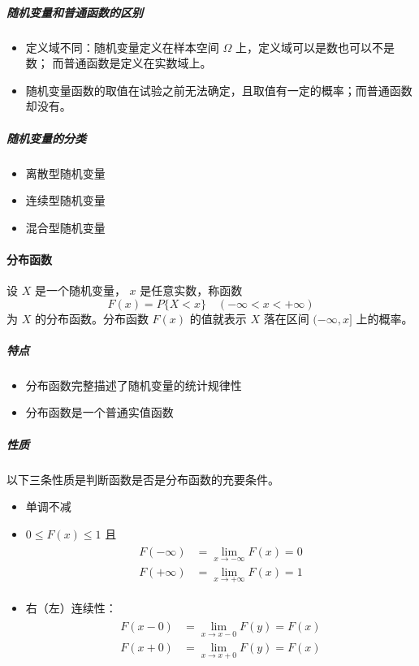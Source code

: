 \subparagraph{随机变量和普通函数的区别}
\begin{itemize}[leftmargin=\subparitemindent]
    \item 定义域不同：随机变量定义在样本空间 $ \Omega $ 上，定义域可以是数也可以不是数；
    而普通函数是定义在实数域上。
    \item 随机变量函数的取值在试验之前无法确定，且取值有一定的概率；而普通函数却没有。
\end{itemize}

\subparagraph{随机变量的分类}
\begin{itemize}[leftmargin=\subparitemindent]
    \item 离散型随机变量
    \item 连续型随机变量
    \item 混合型随机变量
\end{itemize}

\paragraph{分布函数} 设 $ X $ 是一个随机变量， $ x $ 是任意实数，称函数 \begin{equation}
    \label{equ:分布函数定义}
    F(x) = P\{X < x\} \quad (-\infty < x < +\infty)
\end{equation}
为 $ X $ 的分布函数。分布函数 $ F(x) $ 的值就表示 $ X $ 落在区间 $ (-\infty,x] $ 上的概率。

\subparagraph{特点} 
\begin{itemize}[leftmargin=\subparitemindent]
    \item 分布函数完整描述了随机变量的统计规律性
    \item 分布函数是一个普通实值函数 
\end{itemize}

\subparagraph{性质} 以下三条性质是判断函数是否是分布函数的充要条件。
\begin{itemize}[leftmargin=\subparitemindent]
    \item 单调不减
    \item  $ 0 \leqslant F(x) \leqslant 1 $ 且 \begin{align}
        \begin{split}
            F(-\infty) &= \lim_{x \rightarrow -\infty} F(x) = 0 \\
            F(+\infty) &= \lim_{x \rightarrow +\infty} F(x) = 1
        \end{split}
    \end{align}
    \item 右（左）连续性：\begin{align}
        \begin{split}
            F(x - 0) &= \lim_{x \rightarrow x - 0} F(y) = F(x) \\
            F(x + 0) &= \lim_{x \rightarrow x + 0} F(y) = F(x)
        \end{split}
    \end{align}
\end{itemize}

